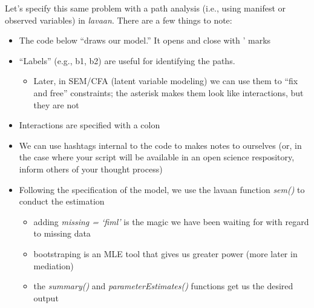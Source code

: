 \documentclass[
  11pt,
]{book}
\providecommand{\tightlist}{%
  \setlength{\itemsep}{0pt}\setlength{\parskip}{0pt}}
\begin{document}
Let's specify this same problem with a path analysis (i.e., using manifest or observed variables) in \emph{lavaan}. There are a few things to note:

\begin{itemize}
\tightlist
\item
  The code below ``draws our model.'' It opens and close with ' marks
\item
  ``Labels'' (e.g., b1, b2) are useful for identifying the paths.

  \begin{itemize}
  \tightlist
  \item
    Later, in SEM/CFA (latent variable modeling) we can use them to ``fix and free'' constraints; the asterisk makes them look like interactions, but they are not
  \end{itemize}
\item
  Interactions are specified with a colon
\item
  We can use hashtags internal to the code to makes notes to ourselves (or, in the case where your script will be available in an open science respository, inform others of your thought process)
\item
  Following the specification of the model, we use the lavaan function \emph{sem()} to conduct the estimation

  \begin{itemize}
  \tightlist
  \item
    adding \emph{missing = `fiml'} is the magic we have been waiting for with regard to missing data
  \item
    bootstraping is an MLE tool that gives us greater power (more later in mediation)
  \item
    the \emph{summary()} and \emph{parameterEstimates()} functions get us the desired output
  \end{itemize}
\end{itemize}
\end{document}
